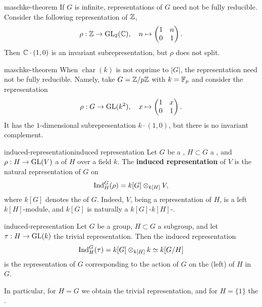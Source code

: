 \begin{example}{maschke-theorem}
    If $G$ is infinite, representations of $G$ need not be fully reducible. Consider the following representation of $\mathbb{Z}$,
    \[ \rho : \mathbb{Z} \to \textup{GL}_2(\mathbb{C}), \quad n \mapsto \begin{pmatrix} 1 & n \\ 0 & 1 \end{pmatrix} . \]
    Then $\mathbb{C} \cdot (1, 0)$ is an invariant subrepresentation, but $\rho$ does not split.
\end{example}

\begin{example}{maschke-theorem}
    When $\operatorname{char}(k)$ is not coprime to $|G|$, the representation need not be fully reducible. Namely, take $G = \mathbb{Z}/p\mathbb{Z}$ with $k = \mathbb{F}_p$ and consider the representation
    \[ \rho : G \to \textup{GL}(k^2), \quad x \mapsto \begin{pmatrix} 1 & x \\ 0 & 1 \end{pmatrix} . \]
    It has the $1$-dimensional subrepresentation $k \cdot (1, 0)$, but there is no invariant complement.
\end{example}

\begin{topic}{induced-representation}{induced representation}
    Let $G$ be a , $H \subset G$ a , and $\rho : H \to \textup{GL}(V)$ a  of $H$ over a field $k$. The \textbf{induced representation} of $V$ is the natural representation of $G$ on
    \[ \textup{Ind}_H^G (\rho) = k[G] \otimes_{k[H]} V , \]
    where $k[G]$ denotes the  of $G$. Indeed, $V$, being a representation of $H$, is a left $k[H]$-module, and $k[G]$ is naturally a $k[G]$-$k[H]$-.
\end{topic}

\begin{example}{induced-representation}
    Let $G$ be a group, $H \subset G$ a subgroup, and let $\tau : H \to \textup{GL}(k)$ the trivial representation. Then the induced representation
    \[ \textup{Ind}_H^G(\tau) = k[G] \otimes_{k[H]} k \simeq k[G/H] \]
    is the representation of $G$ corresponding to the action of $G$ on the (left)  of $H$ in $G$.
    
    In particular, for $H = G$ we obtain the trivial representation, and for $H = \{ 1 \}$ the .
\end{example}


